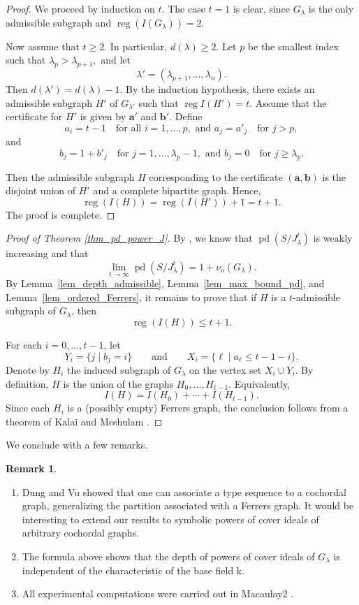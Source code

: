 \documentclass[12pt,amscd]{amsart}
\theoremstyle{definition}
\newtheorem{rem}[thm]{Remark}
\numberwithin{equation}{section}
\DeclareMathOperator{\pd}{pd}
\DeclareMathOperator{\reg}{reg}
\def\a {\mathbf a}
\def\b {\mathbf b}
\def\k {\mathrm{k}}
\begin{document}
\begin{proof}
We proceed by induction on $t$. The case $t = 1$ is clear, since $G_\lambda$ is the only admissible subgraph and
\( \reg (I(G_\lambda)) = 2.\)

Now assume that $t \ge 2$. In particular, $d(\lambda) \ge 2$. Let $p$ be the smallest index such that
\( \lambda_p > \lambda_{p+1},
\) and let
\[
\lambda' = (\lambda_{p+1}, \ldots, \lambda_n).
\]
Then
\( d(\lambda') = d(\lambda) - 1.
\) By the induction hypothesis, there exists an admissible subgraph $H'$ of $G_{\lambda'}$ such that
\(
\reg I(H') = t.
\)
Assume that the certificate for $H'$ is given by $\a'$ and $\b'$. Define
\[
a_i = t-1 \quad \text{for all } i = 1, \ldots, p, \text { and }
a_j = a'_j \quad \text{for } j > p,
\]
and 
\[
b_j = 1 + b'_j \quad \text{for } j = 1, \ldots, \lambda_p-1,
\text{ and }
b_j = 0 \quad \text{for } j \ge \lambda_p.
\]

Then the admissible subgraph $H$ corresponding to the certificate $(\a,\b)$ is the disjoint union of $H'$ and a complete bipartite graph. Hence,
\[
\reg(I(H)) = \reg(I(H')) + 1 = t+1.
\]
The proof is complete.
\end{proof}

\begin{proof}[Proof of Theorem \ref{thm_pd_power_J}]
By \cite{HKTT}, we know that $\pd (S/J_\lambda^t)$ is weakly increasing and that
\[
\lim_{t\to \infty} \pd (S/J_\lambda^t)
=
1 + \nu_o(G_\lambda).
\]
By Lemma~\ref{lem_depth_admissible}, Lemma~\ref{lem_max_bound_pd}, and Lemma~\ref{lem_ordered_Ferrers}, it remains to prove that if $H$ is a $t$-admissible subgraph of $G_\lambda$, then
\[
\reg (I(H)) \le t+1.
\]

For each $i = 0, \ldots, t-1$, let
\[
Y_i = \{ j \mid b_j = i\}
\qquad \text{and} \qquad
X_i = \{ \ell \mid a_\ell \le t-1-i\}.
\]
Denote by $H_i$ the induced subgraph of $G_\lambda$ on the vertex set $X_i \cup Y_i$. By definition, $H$ is the union of the graphs $H_0,\ldots,H_{t-1}$. Equivalently,
\[
I(H) = I(H_0) + \cdots + I(H_{t-1}).
\]
Since each $H_i$ is a (possibly empty) Ferrers graph, the conclusion follows from a theorem of Kalai and Meshulam \cite{KM}.
\end{proof}

We conclude with a few remarks.

\begin{rem}
\begin{enumerate}
    \item Dung and Vu showed that one can associate a type sequence to a cochordal graph, generalizing the partition associated with a Ferrers graph. It would be interesting to extend our results to symbolic powers of cover ideals of arbitrary cochordal graphs.

    \item The formula above shows that the depth of powers of cover ideals of $G_\lambda$ is independent of the characteristic of the base field $\k$.

    \item All experimental computations were carried out in Macaulay2 \cite{M2}.
\end{enumerate}
\end{rem}
\end{document}
